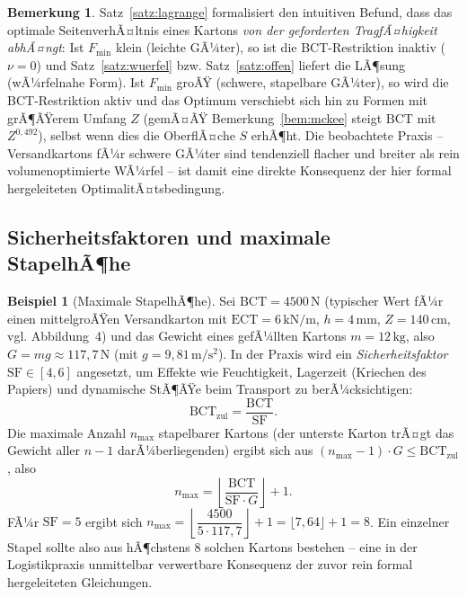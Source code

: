 ﻿\documentclass[a4paper,12pt]{article}
\theoremstyle{definition}
\newtheorem{beispiel}{Beispiel}
\newtheorem{bemerkung}{Bemerkung}
\begin{document}
\begin{bemerkung}
	Satz~\ref{satz:lagrange} formalisiert den intuitiven Befund, dass das
	optimale SeitenverhÃ¤ltnis eines Kartons \emph{von der geforderten
	TragfÃ¤higkeit abhÃ¤ngt}: Ist $F_{\min}$ klein (leichte GÃ¼ter), so ist die
	BCT-Restriktion inaktiv ($\nu = 0$) und Satz~\ref{satz:wuerfel} bzw.
	Satz~\ref{satz:offen} liefert die LÃ¶sung (wÃ¼rfelnahe Form). Ist $F_{\min}$
	groÃŸ (schwere, stapelbare GÃ¼ter), so wird die BCT-Restriktion aktiv und das
	Optimum verschiebt sich hin zu Formen mit grÃ¶ÃŸerem Umfang $Z$ (gemÃ¤ÃŸ
	Bemerkung~\ref{bem:mckee} steigt $\mathrm{BCT}$ mit $Z^{0{,}492}$), selbst
	wenn dies die OberflÃ¤che $S$ erhÃ¶ht. Die beobachtete Praxis -- Versandkartons
	fÃ¼r schwere GÃ¼ter sind tendenziell flacher und breiter als rein
	volumenoptimierte WÃ¼rfel -- ist damit eine direkte Konsequenz der hier
	formal hergeleiteten OptimalitÃ¤tsbedingung.
\end{bemerkung}

\subsection{Sicherheitsfaktoren und maximale StapelhÃ¶he}

\begin{beispiel}[Maximale StapelhÃ¶he]
	Sei $\mathrm{BCT} = 4500\,\mathrm{N}$ (typischer Wert fÃ¼r einen mittelgroÃŸen
	Versandkarton mit $\mathrm{ECT} = 6\,\mathrm{kN/m}$, $h = 4\,\mathrm{mm}$,
	$Z = 140\,\mathrm{cm}$, vgl. Abbildung~4) und das Gewicht eines gefÃ¼llten
	Kartons $m = 12\,\mathrm{kg}$, also $G = mg \approx 117{,}7\,\mathrm{N}$
	(mit $g = 9{,}81\,\mathrm{m/s^2}$). In der Praxis wird ein
	\emph{Sicherheitsfaktor} $\mathrm{SF} \in [4,6]$ angesetzt, um Effekte wie
	Feuchtigkeit, Lagerzeit (Kriechen des Papiers) und dynamische StÃ¶ÃŸe beim
	Transport zu berÃ¼cksichtigen:
	\[
		\mathrm{BCT}_{\mathrm{zul}} = \frac{\mathrm{BCT}}{\mathrm{SF}}.
	\]
	Die maximale Anzahl $n_{\max}$ stapelbarer Kartons (der unterste Karton
	trÃ¤gt das Gewicht aller $n-1$ darÃ¼berliegenden) ergibt sich aus
	$(n_{\max}-1) \cdot G \leq \mathrm{BCT}_{\mathrm{zul}}$, also
	\[
		n_{\max} = \left\lfloor \frac{\mathrm{BCT}}{\mathrm{SF}\cdot G} \right\rfloor + 1.
	\]
	FÃ¼r $\mathrm{SF} = 5$ ergibt sich
	$n_{\max} = \left\lfloor \dfrac{4500}{5 \cdot 117{,}7} \right\rfloor + 1
	= \lfloor 7{,}64 \rfloor + 1 = 8$. Ein einzelner Stapel sollte also aus
	hÃ¶chstens $8$ solchen Kartons bestehen -- eine in der Logistikpraxis
	unmittelbar verwertbare Konsequenz der zuvor rein formal hergeleiteten
	Gleichungen.
\end{beispiel}
\end{document}
